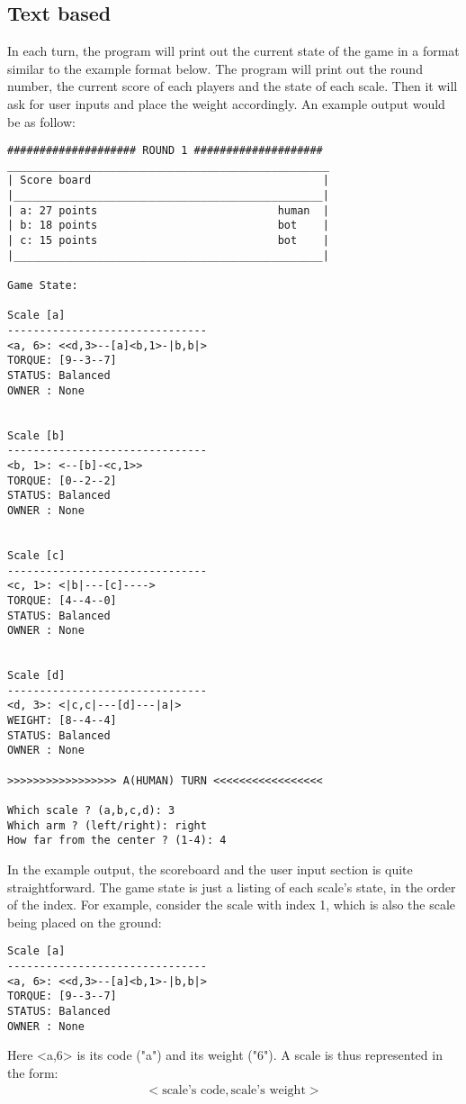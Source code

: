 \documentclass[12pt]{article}
\begin{document}
\subsection{Text based}
In each turn, the program will print out the current state of the game in a
format similar to the example format below. The program will print out the round
number, the current score of each players and the state of each scale. Then it
will ask for user inputs and place the weight accordingly. An example output
would be as follow:
\begin{verbatim}
#################### ROUND 1 ####################
__________________________________________________
| Score board                                    |
|________________________________________________|
| a: 27 points                            human  |
| b: 18 points                            bot    |
| c: 15 points                            bot    |
|________________________________________________|

Game State:

Scale [a]
-------------------------------
<a, 6>: <<d,3>--[a]<b,1>-|b,b|> 
TORQUE: [9--3--7] 
STATUS: Balanced
OWNER : None


Scale [b]
-------------------------------
<b, 1>: <--[b]-<c,1>> 
TORQUE: [0--2--2] 
STATUS: Balanced
OWNER : None


Scale [c]
-------------------------------
<c, 1>: <|b|---[c]----> 
TORQUE: [4--4--0] 
STATUS: Balanced
OWNER : None


Scale [d]
-------------------------------
<d, 3>: <|c,c|---[d]---|a|> 
WEIGHT: [8--4--4] 
STATUS: Balanced
OWNER : None

>>>>>>>>>>>>>>>>> A(HUMAN) TURN <<<<<<<<<<<<<<<<<

Which scale ? (a,b,c,d): 3
Which arm ? (left/right): right
How far from the center ? (1-4): 4
\end{verbatim}

In the example output, the scoreboard and the user input section is quite
straightforward. The game state is just a listing of each scale's state, in the
order of the index. For example, consider the scale with index 1, which is also
the scale being placed on the ground:
\begin{verbatim}
Scale [a]
-------------------------------
<a, 6>: <<d,3>--[a]<b,1>-|b,b|> 
TORQUE: [9--3--7] 
STATUS: Balanced
OWNER : None
\end{verbatim}

Here <a,6> is its code ("a") and its weight ("6"). A scale is thus represented
in the form:
\begin{align*}
  <\text{scale's code}, \text{scale's weight}>
\end{align*}
\end{document}
